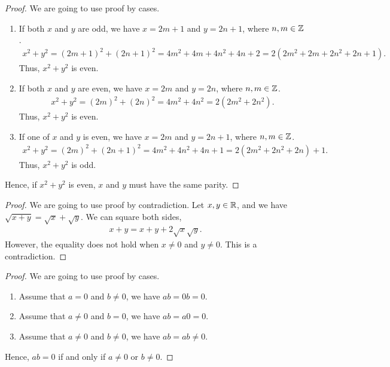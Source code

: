 \documentclass[8pt]{article}
\begin{document}
\begin{Answer}[number=2.2.11]
  \begin{proof}
    We are going to use proof by cases.
    \begin{enumerate}
      \item If both $x$ and $y$ are odd, we have $x=2m+1$ and $y=2n+1$, where
        $n,m\in\mathbb{Z}$.
        \begin{align*}
          x^2 + y^2 = (2m+1)^2 + (2n+1)^2 = 4m^2 + 4m + 4n^2 + 4n + 2 =
          2(2m^2+2m+2n^2+2n+1).
        \end{align*}
        Thus, $x^2+y^2$ is even.
      \item If both $x$ and $y$ are even, we have $x=2m$ and $y=2n$, where
        $n,m\in\mathbb{Z}$.
        \begin{align*}
          x^2 + y^2 = (2m)^2 + (2n)^2 = 4m^2 + 4n^2 = 2(2m^2+2n^2).
        \end{align*}
        Thus, $x^2+y^2$ is even.
      \item If one of $x$ and $y$ is even, we have $x=2m$ and $y=2n+1$, where
        $n,m\in\mathbb{Z}$.
        \begin{align*}
          x^2 + y^2 = (2m)^2 + (2n+1)^2 = 4m^2 + 4n^2 + 4n + 1 =
          2(2m^2+2n^2+2n) + 1.
        \end{align*}
        Thus, $x^2+y^2$ is odd.
    \end{enumerate}
    Hence, if $x^2+y^2$ is even, $x$ and $y$ must have the same parity.
  \end{proof}
\end{Answer}

\begin{Answer}[number=2.2.12]
  \begin{proof}
    We are going to use proof by contradiction. Let $x,y\in\mathbb{R}$, and we have
    $\sqrt{x+y}=\sqrt{x}+\sqrt{y}$. We can square both sides,
    \begin{align*}
      x+y = x + y + 2\sqrt{x}\sqrt{y}.
    \end{align*}
    However, the equality does not hold when $x\ne0$ and $y\ne0$.
    This is a contradiction.
  \end{proof}
\end{Answer}


\begin{Answer}[number=2.2.13]
  \begin{proof}
    We are going to use proof by cases.
    \begin{enumerate}
      \item Assume that $a=0$ and $b\ne0$, we have $ab = 0b = 0$.
      \item Assume that $a\ne0$ and $b=0$, we have $ab = a0 = 0$.
      \item Assume that $a\ne0$ and $b\ne0$, we have $ab = ab \ne 0$.
    \end{enumerate}
    Hence, $ab=0$ if and only if $a\ne0$ or $b\ne0$.
  \end{proof}
\end{Answer}
\end{document}
